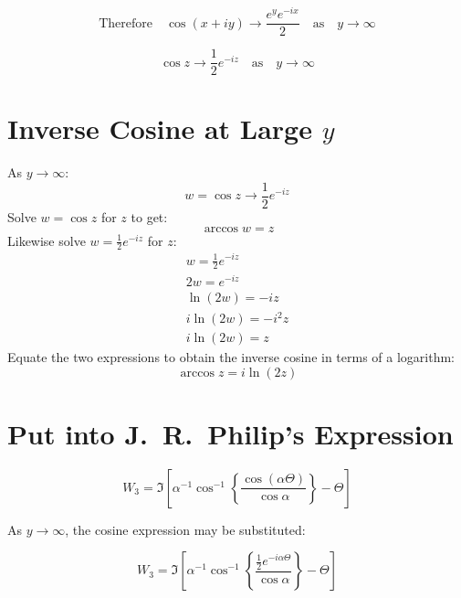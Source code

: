 \documentclass[12pt, a4paper, twoside, openright]{book}
\begin{document}
\begin{equation}
\text{Therefore} \quad \cos (x + iy) \to  \frac{e^{y} e^{-ix}}{2}
\quad \text{as} \quad y \to \infty
\end{equation}

\begin{equation}
\cos z \to \frac{1}{2} e^{-iz} \quad \text{as} \quad y \to \infty
\end{equation}


\section{Inverse Cosine at Large $y$}

As $y \to \infty$:
\begin{equation}
w = \cos z \to \frac{1}{2} e^{-iz}
\end{equation}
Solve $w = \cos z$ for $z$ to get:
\begin{equation*}
\arccos w = z
\end{equation*}
Likewise solve $w = \frac{1}{2} e^{-iz}$ for $z$:
\begin{gather*}
w = \frac{1}{2} e^{-iz} \\
2 w = e^{-iz} \\
\ln (2w) = -iz \\
i \ln (2w) = -i^2 z \\
i \ln (2w) = z
\end{gather*}
Equate the two expressions to obtain the inverse cosine in terms of a logarithm:
\begin{equation}
\arccos z = i \ln(2z)
\end{equation}

\section{Put into J.\ R.\ Philip's Expression}

\begin{equation}
W_{3} = \Im \left[  
 \alpha^{-1} \cos^{-1} 
 \left\{ \frac{\cos(\alpha \Theta)}{\cos \alpha} \right\} - \Theta
   \right]
\end{equation}

As $y \to \infty$, the cosine expression may be substituted:

\begin{equation}
W_{3} = \Im \left[  
 \alpha^{-1} \cos^{-1} 
 \left\{ \frac{\frac{1}{2} e^{-i \alpha \Theta}}{\cos \alpha} \right\} - \Theta
   \right]
\end{equation}
\end{document}
